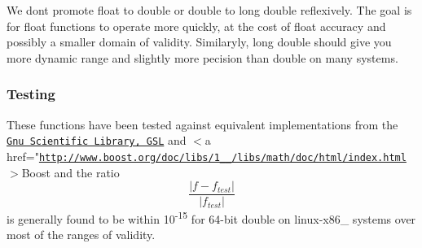We don\textquotesingle{}t promote {\ttfamily float} to {\ttfamily double} or {\ttfamily double} to {\ttfamily long double} reflexively. The goal is for {\ttfamily float} functions to operate more quickly, at the cost of {\ttfamily float} accuracy and possibly a smaller domain of validity. Similaryly, {\ttfamily long double} should give you more dynamic range and slightly more pecision than {\ttfamily double} on many systems.\hypertarget{group__mathsf_mathsf_testing}{}\subsubsection{Testing}\label{group__mathsf_mathsf_testing}
These functions have been tested against equivalent implementations from the \href{http://www.gnu.org/software/gsl}{\tt Gnu Scientific Library, G\+SL} and $<$a href="\href{http://www.boost.org/doc/libs/1_60_0/libs/math/doc/html/index.html}{\tt http\+://www.\+boost.\+org/doc/libs/1\+\_\+\_/libs/math/doc/html/index.\+html}$>$Boost and the ratio \[ \frac{|f - f_{test}|}{|f_{test}|} \] is generally found to be within 10\textsuperscript{-\/15} for 64-\/bit double on linux-\/x86\+\_ systems over most of the ranges of validity.

